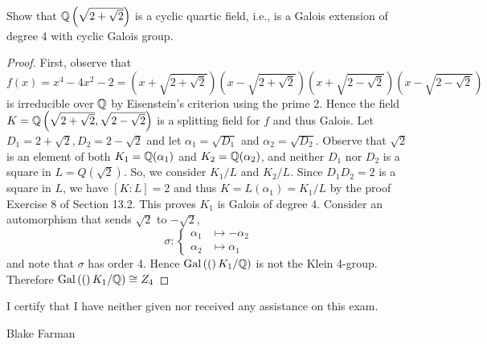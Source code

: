 \documentclass[10pt]{amsart}
\begin{document}
\begin{thm}
  \label{Ex7}
  Show that $\mathbb{Q}\left(\sqrt{2 + \sqrt{2}}\right)$ is a cyclic quartic field, i.e., is a Galois extension of degree 4 with cyclic Galois group.
  \begin{proof}
    First, observe that 
    $$f(x) = x^4 - 4x^2 -2 = \left(x+\sqrt{2 + \sqrt{2}}\right)\left(x-\sqrt{2 + \sqrt{2}}\right)\left(x+\sqrt{2 - \sqrt{2}}\right)\left(x-\sqrt{2 - \sqrt{2}}\right)$$ 
    is irreducible over $\mathbb{Q}$ by Eisenstein's criterion using the prime 2.
    Hence the field $K = \mathbb{Q}\left(\sqrt{2 + \sqrt{2}}, \sqrt{2 - \sqrt{2}}\right)$ is a splitting field for $f$ and thus Galois.
    Let $D_1 =2 + \sqrt{2}, D_2 = 2 - \sqrt{2}$ and let $\alpha_1 = \sqrt{D_1}$ and $\alpha_2 = \sqrt{D_2}$.
    Observe that $\sqrt{2}$ is an element of both $K_1 = \mathbb{Q}(\alpha_1)$ and $K_2 = \mathbb{Q}(\alpha_2)$, and neither $D_1$ nor $D_2$ is a square in $L = Q\left(\sqrt{2}\right)$.
    So, we consider $K_1/L$ and $K_2/L$.
    Since $D_1D_2 = 2$ is a square in $L$, we have $[K:L] = 2$ and thus $K = L(\alpha_1) = K_1/L$ by the proof Exercise 8 of Section 13.2.
    This proves $K_1$ is Galois of degree 4.
    Consider an automorphism that sends $\sqrt{2}$ to $-\sqrt{2}$,
    $$
    \sigma: \begin{cases}
      \alpha_1 &\longmapsto -\alpha_2\\
      \alpha_2 &\longmapsto \alpha_1
    \end{cases}
    $$
    and note that $\sigma$ has order 4.
    Hence $\operatorname{Gal}\left((\right)K_1/\mathbb{Q})$ is not the Klein 4-group.
    Therefore $\operatorname{Gal}\left((\right)K_1/\mathbb{Q}) \cong Z_4$
  \end{proof}
\end{thm}

I certify that I have neither given nor received any assistance on this exam.

\vspace{.75in}

Blake Farman
\end{document}

